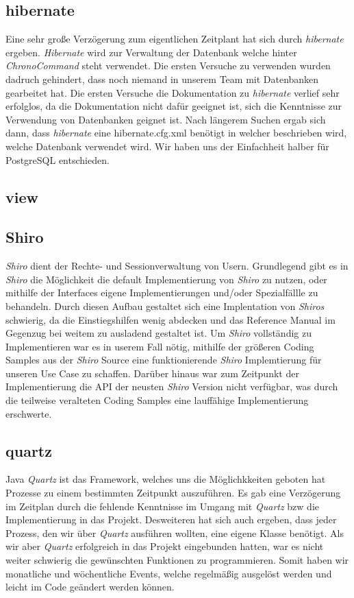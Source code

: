 \subsection{hibernate}
Eine sehr große Verzögerung zum eigentlichen Zeitplant hat sich durch \emph{hibernate} ergeben. \emph{Hibernate} wird zur Verwaltung der
Datenbank welche hinter \emph{ChronoCommand} steht verwendet. Die ersten Versuche  zu verwenden wurden dadruch
gehindert, dass noch niemand in unserem Team mit Datenbanken gearbeitet hat. Die ersten Versuche die Dokumentation zu 
\emph{hibernate} verlief sehr erfolglos, da die Dokumentation nicht dafür geeignet ist, sich die Kenntnisse zur Verwendung von
Datenbanken geignet ist. Nach längerem Suchen ergab sich dann, dass \emph{hibernate} eine hibernate.cfg.xml benötigt in welcher 
beschrieben wird, welche Datenbank verwendet wird. Wir haben uns der Einfachheit halber für PostgreSQL entschieden. 


\subsection{view} %

\subsection{Shiro}
\emph{Shiro} dient der Rechte- und Sessionverwaltung von Usern.
Grundlegend gibt es in \emph{Shiro} die Möglichkeit die default Implementierung von \emph{Shiro} zu nutzen, oder mithilfe der Interfaces
eigene Implementierungen und/oder Spezialfällle zu behandeln.
Durch diesen Aufbau gestaltet sich eine Implentation von \emph{Shiros} schwierig, da die Einstiegshilfen wenig abdecken und das Reference Manual
im Gegenzug bei weitem zu ausladend gestaltet ist. Um \emph{Shiro} vollständig zu Implementieren war es in userem Fall nötig, mithilfe der
größeren Coding Samples aus der \emph{Shiro} Source eine funktionierende \emph{Shiro} Implemtierung für unseren Use Case zu schaffen.
Darüber hinaus war zum Zeitpunkt der Implementierung die API der neusten \emph{Shiro} Version nicht verfügbar, was durch die teilweise veralteten Coding Samples
 eine lauffähige Implementierung erschwerte.
 
\subsection{quartz} 
Java \emph{Quartz} ist das Framework, welches uns die Möglichkkeiten geboten hat Prozesse zu einem bestimmten Zeitpunkt auszuführen. Es gab eine Verzögerung im Zeitplan durch die fehlende Kenntnisse im Umgang mit \emph{Quartz} bzw die Implementierung in das Projekt.
Desweiteren hat sich auch ergeben, dass jeder Prozess, den wir über \emph{Quartz} ausführen wollten, eine eigene Klasse benötigt. Als wir aber \emph{Quartz} erfolgreich in das Projekt eingebunden hatten, war es nicht weiter schwierig die gewünschten Funktionen zu programmieren. Somit haben wir monatliche und wöchentliche Events, welche regelmäßig ausgelöst werden und leicht im Code geändert werden können.

